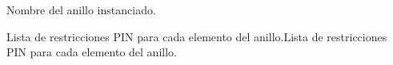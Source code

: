 \documentclass[letterpaper,10pt,english]{sphinxmanual}
\begin{document}
\begin{fulllineitems}

\begin{fulllineitems}
\label{\detokenize{fpga.ring_osc:fpga.ring_osc.GaloisRing.name}}
\pysigstartsignatures
{}
\pysigstopsignatures
\sphinxAtStartPar
Nombre del anillo instanciado.

\end{fulllineitems}


\begin{fulllineitems}
\label{\detokenize{fpga.ring_osc:fpga.ring_osc.GaloisRing.pin}}
\pysigstartsignatures
{}
\pysigstopsignatures
\sphinxAtStartPar
Lista de restricciones PIN para cada elemento del anillo.Lista de restricciones PIN para cada elemento del anillo.

\end{fulllineitems}


\end{fulllineitems}

\end{document}
